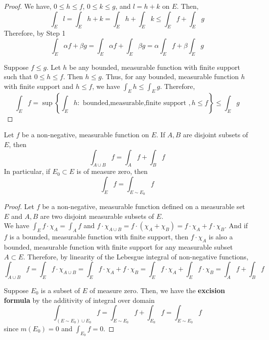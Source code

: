 \begin{proof}
	We have, $0 \le h \le f$, $0 \le k \le g$, and $ l = h+k$ on $E$.
	Then,
	\begin{equation}
		\int_E l = \int_E h + k = \int_E h + \int_E k \le \int_E f + \int_E g
	\end{equation}
	Therefore, by Step 1
	\[ \int_E \alpha f+ \beta g = \int_E \alpha f + \int_E \beta g = \alpha \int_E f + \beta \int_E g \]

	Suppose $f \le g$.
	Let $h$ be any bounded, measurable function with finite support such that $0 \le h \le f$.
	Then $h \le g$.
	Thus, for any bounded, measurable function $h$ with finite support and $h \le f$, we have $\displaystyle \int_E h \le \int_E g$.
	Therefore,
	\[ \int_E f = \sup \left\{ \int_E h : \text{ bounded,measurable,finite support },h \le f \right\} \le \int_E g \]
\end{proof}

\begin{theorem}
	Let $f$ be a non-negative, measurable function on $E$.
	If $A,B$ are disjoint subsets of $E$, then
	\begin{equation}
		\int_{A \cup B} f = \int_A f + \int_B f
	\end{equation}
	In particular, if $E_0 \subset E$ is of measure zero, then
	\begin{equation}
		\int_{E} f = \int_{E \sim E_0} f
	\end{equation}
\end{theorem}
\begin{proof}
	Let $f$ be a non-negative, measurable function defined on a measurable set $E$ and $A,B$ are two disjoint measurable subsets of $E$.\\

	We have $\displaystyle \int_E f \cdot \chi_A = \int_A f$ and $f \cdot \chi_{A \cup B} = f \cdot (\chi_{A} + \chi_B) = f \cdot \chi_A + f \cdot \chi_B$.
	And if $f$ is a bounded, measurable function with finite support, then $f \cdot \chi_A$ is also a bounded, measurable function with finite support for any measurable subset $A \subset E$.
	Therefore, by linearity of the Lebesgue integral of non-negative functions,
	\[ \int_{A \cup B} f = \int_E f \cdot \chi_{A \cup B} = \int_E f \cdot \chi_A + f \cdot \chi_B = \int_E f \cdot \chi_A + \int_E f \cdot \chi_B = \int_A f + \int_B f \]

	Suppose $E_0$ is a subset of $E$ of measure zero.
	Then, we have the \textbf{excision formula} by the additivity of integral over domain
	\begin{equation}
		\int_{(E \sim E_0) \cup E_0} f = \int_{E \sim E_0} f + \int_{E_0} f = \int_{E \sim E_0} f
	\end{equation}
	since $m(E_0) = 0$ and $\displaystyle \int_{E_0} f = 0$.
\end{proof}

